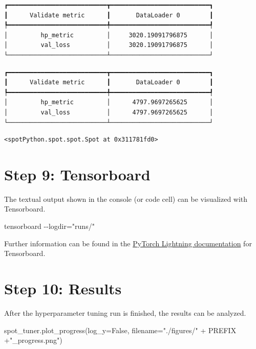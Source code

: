 \documentclass[
  letterpaper,
  DIV=11,
  numbers=noendperiod]{scrreprt}
\newenvironment{Shaded}{\begin{snugshade}}{\end{snugshade}}
\newcommand{\NormalTok}[1]{\textcolor[rgb]{0.00,0.23,0.31}{#1}}
\newcommand{\OperatorTok}[1]{\textcolor[rgb]{0.37,0.37,0.37}{#1}}
\newcommand{\StringTok}[1]{\textcolor[rgb]{0.13,0.47,0.30}{#1}}
\newcommand{\VariableTok}[1]{\textcolor[rgb]{0.07,0.07,0.07}{#1}}
\begin{document}
\begin{verbatim}
┏━━━━━━━━━━━━━━━━━━━━━━━━━━━┳━━━━━━━━━━━━━━━━━━━━━━━━━━━┓
┃      Validate metric      ┃       DataLoader 0        ┃
┡━━━━━━━━━━━━━━━━━━━━━━━━━━━╇━━━━━━━━━━━━━━━━━━━━━━━━━━━┩
│         hp_metric         │     3020.19091796875      │
│         val_loss          │     3020.19091796875      │
└───────────────────────────┴───────────────────────────┘
\end{verbatim}

\begin{verbatim}
┏━━━━━━━━━━━━━━━━━━━━━━━━━━━┳━━━━━━━━━━━━━━━━━━━━━━━━━━━┓
┃      Validate metric      ┃       DataLoader 0        ┃
┡━━━━━━━━━━━━━━━━━━━━━━━━━━━╇━━━━━━━━━━━━━━━━━━━━━━━━━━━┩
│         hp_metric         │      4797.9697265625      │
│         val_loss          │      4797.9697265625      │
└───────────────────────────┴───────────────────────────┘
\end{verbatim}

\begin{verbatim}
<spotPython.spot.spot.Spot at 0x311781fd0>
\end{verbatim}

\section{Step 9: Tensorboard}\label{sec-tensorboard-31}

The textual output shown in the console (or code cell) can be visualized
with Tensorboard.

\begin{Shaded}
\begin{Highlighting}[]
\NormalTok{tensorboard {-}{-}logdir="runs/"}
\end{Highlighting}
\end{Shaded}

Further information can be found in the
\href{https://lightning.ai/docs/pytorch/stable/api/lightning.pytorch.loggers.tensorboard.html}{PyTorch
Lightning documentation} for Tensorboard.

\section{Step 10: Results}\label{sec-results-31}

After the hyperparameter tuning run is finished, the results can be
analyzed.

\begin{Shaded}
\begin{Highlighting}[]
\NormalTok{spot\_tuner.plot\_progress(log\_y}\OperatorTok{=}\VariableTok{False}\NormalTok{,}
\NormalTok{    filename}\OperatorTok{=}\StringTok{"./figures/"} \OperatorTok{+}\NormalTok{ PREFIX }\OperatorTok{+}\StringTok{"\_progress.png"}\NormalTok{)}
\end{Highlighting}
\end{Shaded}
\end{document}
